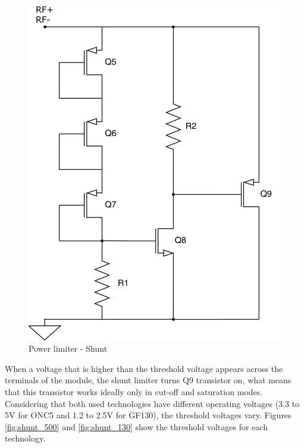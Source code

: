 \documentclass{article} %
\begin{document}
\begin{multicols}{2}
\begin{figure}[H]
\centering
\includegraphics[scale=0.045]{Images/ImagenesTesina/circuitos/Shunt.png}
\caption{Power limiter - Shunt}
\label{fig:shunt}
\end{figure}

When a voltage that is higher than the threshold voltage appears across the terminals of the module, the shunt limiter turns Q9 transistor on, what means that this transistor works ideally only in cut-off and saturation modes. 
Considering that both used technologies have different operating voltages (3.3 to 5V for ONC5 and 1.2 to 2.5V for GF130), the threshold voltages vary. Figures \ref{fig:shunt_500} and \ref{fig:shunt_130} show the threshold voltages for each technology.


\end{multicols}
\end{document}
